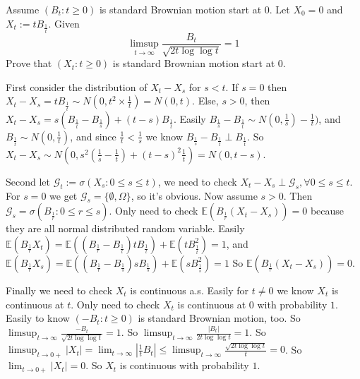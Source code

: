 \documentclass{ctexart}
\begin{document}
\begin{problem}\label{pro:4}
  Assume \((B_t:t \geq 0)\) is standard Brownian motion start at \(0\).
  Let \(X_0=0\) and \(X_t:=t B_{\frac{1}{t}}\).
  Given
  \[
    \limsup_{t \to \infty}\frac{B_{t}}{\sqrt{2t \log \log t}}=1
  \]
  Prove that \((X_t:t \geq 0)\) is standard Brownian motion start at \(0\).
\end{problem}
\begin{solution}
  First consider the distribution of \(X_t-X_s\) for \(s <t\).
  If \(s=0\) then \(X_t-X_s=t B_{\frac{1}{t}} \sim N(0,t^2 \times \frac{1}{t})=N(0,t)\).
  Else, \(s >0\), then \(X_t-X_s =s(B_{\frac{1}{t}}-B_{\frac{1}{s}})+(t-s)B_{\frac{1}{t}}\).
  Easily \(B_{\frac{1}{s}}-B_{\frac{1}{t}} \sim N(0,\frac{1}{s})-\frac{1}{t})\),
  and \(B_{\frac{1}{t}} \sim N(0,\frac{1}{t})\), and since \(\frac{1}{t}<\frac{1}{s}\) we know
  \(B_{\frac{1}{s}}-B_{\frac{1}{t}}\perp B_{\frac{1}{t}}\).
  So \(X_t-X_s \sim N(0,s^2(\frac{1}{s}-\frac{1}{t})+(t-s)^2 \frac{1}{t})=N(0,t-s)\).

  Second let \(\mathcal{G}_t:=\sigma(X_s:0 \leq s \leq t)\),
  we need to check \(X_t-X_s \perp \mathcal{G}_s,\forall 0 \leq s \leq t\).
  For \(s=0\) we get \(\mathcal{G}_s=\{\emptyset,\Omega\}\), so it's obvious.
  Now assume \(s>0\). Then \(\mathcal{G}_s=\sigma(B_{\frac{1}{r}}:0 \leq r \leq s)\).
  Only need to check \(\mathbb{E}(B_{\frac{1}{r}}(X_t-X_s))=0\) because they are all normal distributed random variable.
  Easily \(\mathbb{E}(B_{\frac{1}{r}}X_t)=\mathbb{E}((B_{\frac{1}{r}}-B_{\frac{1}{t}})tB_{\frac{1}{t}})+\mathbb{E}(t B_{\frac{1}{t}}^2)=1\),
  and \(\mathbb{E}(B_{\frac{1}{r}}X_s)=\mathbb{E}((B_{\frac{1}{r}}-B_{\frac{1}{s}})sB_{\frac{1}{s}})+\mathbb{E}(s B_{\frac{1}{s}}^2)=1\)
  So \(\mathbb{E}(B_{\frac{1}{r}}(X_t-X_s))=0\).

  Finally we need to check \(X_t\) is continuous a.s.
  Easily for \(t \neq 0\) we know \(X_t\) is continuous at \(t\).
  Only need to check \(X_t\) is continuous at \(0\) with probability \(1\).
  Easily to know \((-B_t:t \geq 0)\) is standard Brownian motion, too.
  So \(\limsup_{t \to \infty}\frac{-B_t}{\sqrt{2t \log \log t}}=1\).
  So \(\limsup_{t \to \infty}\frac{|B_t|}{2t \log \log t}=1\).
  So \(\limsup_{t \to 0+}|X_t|=\lim_{t \to \infty} |\frac{1}{t}B_{t}| \leq \limsup_{t \to \infty}\frac{\sqrt{2 t \log \log t}}{t}=0\).
  So \(\lim_{t \to 0+}|X_t|=0\).
  So \(X_t\) is continuous with probability \(1\).
\end{solution}
\end{document}
